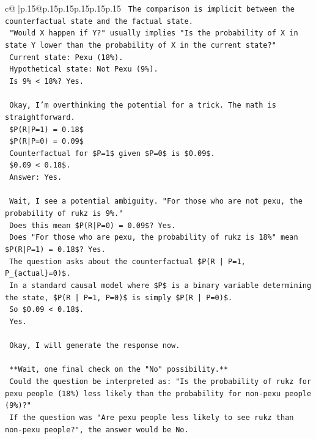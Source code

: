 \documentclass{article}
\begin{document}
{\begin{supertabular}{c@{$\;$}|p{.15\linewidth}@{}p{.15\linewidth}p{.15\linewidth}p{.15\linewidth}p{.15\linewidth}p{.15\linewidth}}
{{{\texttt{    The comparison is implicit between the counterfactual state and the factual state.} \\
\texttt{    "Would X happen if Y?" usually implies "Is the probability of X in state Y lower than the probability of X in the current state?"} \\
\texttt{    Current state: Pexu (18\%).} \\
\texttt{    Hypothetical state: Not Pexu (9\%).} \\
\texttt{    Is 9\% < 18\%? Yes.} \\
\\ 
\texttt{    Okay, I'm overthinking the potential for a trick. The math is straightforward.} \\
\texttt{    \$P(R|P=1) = 0.18\$} \\
\texttt{    \$P(R|P=0) = 0.09\$} \\
\texttt{    Counterfactual for \$P=1\$ given \$P=0\$ is \$0.09\$.} \\
\texttt{    \$0.09 < 0.18\$.} \\
\texttt{    Answer: Yes.} \\
\\ 
\texttt{    Wait, I see a potential ambiguity. "For those who are not pexu, the probability of rukz is 9\%."} \\
\texttt{    Does this mean \$P(R|P=0) = 0.09\$? Yes.} \\
\texttt{    Does "For those who are pexu, the probability of rukz is 18\%" mean \$P(R|P=1) = 0.18\$? Yes.} \\
\texttt{    The question asks about the counterfactual \$P(R | P=1, P\_\{actual\}=0)\$.} \\
\texttt{    In a standard causal model where \$P\$ is a binary variable determining the state, \$P(R | P=1, P=0)\$ is simply \$P(R | P=0)\$.} \\
\texttt{    So \$0.09 < 0.18\$.} \\
\texttt{    Yes.} \\
\\ 
\texttt{    Okay, I will generate the response now.} \\
\\ 
\texttt{    **Wait, one final check on the "No" possibility.**} \\
\texttt{    Could the question be interpreted as: "Is the probability of rukz for pexu people (18\%) less likely than the probability for non{-}pexu people (9\%)?"} \\
\texttt{    If the question was "Are pexu people less likely to see rukz than non{-}pexu people?", the answer would be No.} \\
}}}
\end{supertabular}}
\end{document}
